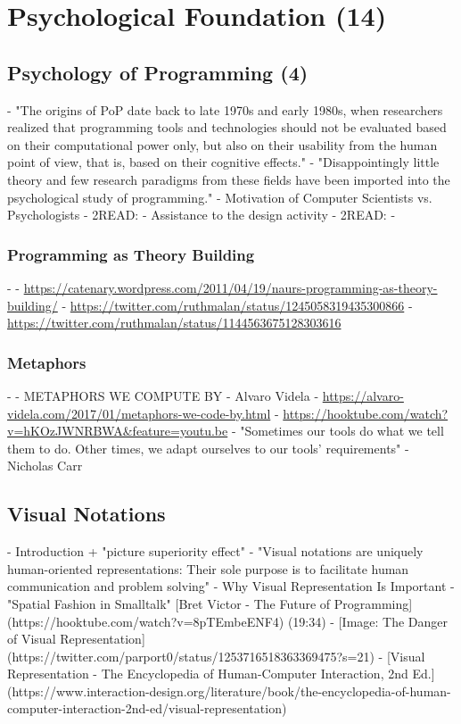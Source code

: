 \chapter{Psychological Foundation (14)}

\section{Psychology of Programming (4)}
- "The origins of PoP date back to late 1970s and early 1980s, when researchers realized that programming tools and technologies should not be evaluated based on their computational power only, but also on their usability from the human point of view, that is, based on their cognitive effects." \autocite[4]{sajaniemi_psychology_2008}
- "Disappointingly little theory and few research paradigms from these fields have been imported into the psychological study of programming." \autocite[253]{curtis_psychology_1990}
- Motivation of Computer Scientists vs. Psychologists \autocite[4]{sajaniemi_psychology_2008}
- 2READ: \autocite{detienne_expert_1990}
- Assistance to the design activity \autocite[246--247]{visser_expert_1990}
- 2READ: \autocite{watt_syntonicity_1998}
- \autocite{weinberg_psychology_1971}
\subsection{Programming as Theory Building}
- \autocite{naur_programming_1985}
- \url{https://catenary.wordpress.com/2011/04/19/naurs-programming-as-theory-building/}
- \url{https://twitter.com/ruthmalan/status/1245058319435300866}
- \url{https://twitter.com/ruthmalan/status/1144563675128303616}
\subsection{Metaphors}
- \autocite[239--240]{naur_programming_1985}
- METAPHORS WE COMPUTE BY - Alvaro Videla
  - \url{https://alvaro-videla.com/2017/01/metaphors-we-code-by.html}
  - \url{https://hooktube.com/watch?v=hKOzJWNRBWA&feature=youtu.be}
  - "Sometimes our tools do what we tell them to do. Other times, we adapt ourselves to our tools’ requirements" - Nicholas Carr

\section{Visual Notations}
- Introduction + "picture superiority effect" \autocite[756]{moody_physics_2009}
- "Visual notations are uniquely human-oriented representations: Their sole purpose is to facilitate human communication and problem solving" \autocite[757]{moody_physics_2009}
- Why Visual Representation Is Important \autocite[758--759]{moody_physics_2009}
- "Spatial Fashion in Smalltalk" [Bret Victor - The Future of Programming](https://hooktube.com/watch?v=8pTEmbeENF4) (19:34)
- [Image: The Danger of Visual Representation](https://twitter.com/parport0/status/1253716518363369475?s=21)
- [Visual Representation - The Encyclopedia of Human-Computer Interaction, 2nd Ed.](https://www.interaction-design.org/literature/book/the-encyclopedia-of-human-computer-interaction-2nd-ed/visual-representation)
